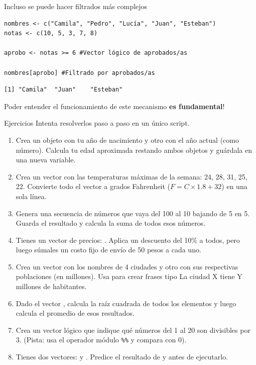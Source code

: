 \documentclass[8pt]{beamer}
\begin{document}
\begin{frame}[fragile]
	Incluso se  puede hacer filtrados m\'as complejos
	
\begin{lstlisting}[style=RScript]
nombres <- c("Camila", "Pedro", "Lucía", "Juan", "Esteban")
notas <- c(10, 5, 3, 7, 8)

aprobo <- notas >= 6 #Vector lógico de aprobados/as

nombres[aprobo] #Filtrado por aprobados/as
\end{lstlisting}
\begin{lstlisting}[style=RConsole]
[1] "Camila"  "Juan"    "Esteban"
\end{lstlisting}

Poder entender el funcionamiento de este mecanismo \textbf{es fundamental}!
\end{frame}


\begin{frame}[fragile]{Ejercicios}
	Intenta resolverlos paso a paso en un \'unico script.
	
	\begin{enumerate}
		\item Crea un objeto con tu año de nacimiento y otro con el año actual (como número). Calcula tu edad aproximada restando ambos objetos y guárdala en una nueva variable.
		\item Crea un vector con las temperaturas máximas de la semana: 24, 28, 31, 25, 22. Convierte todo el vector a grados Fahrenheit ($F = C \times 1.8 + 32$) en una sola línea.
		\item Genera una secuencia de números que vaya del 100 al 10 bajando de 5 en 5. Guarda el resultado y calcula la suma de todos esos números.
		\item Tienes un vector de precios: . Aplica un descuento del 10\% a todos, pero luego súmales un costo fijo de envío de 50 pesos a cada uno.
		\item Crea un vector con los nombres de 4 ciudades y otro con sus respectivas poblaciones (en millones). Usa  para crear frases tipo \guillemetleft La ciudad X tiene Y millones de habitantes\guillemetright .
		\item Dado el vector , calcula la raíz cuadrada de todos los elementos y luego calcula el promedio de esos resultados.
		\item Crea un vector lógico que indique qué números del 1 al 20 son divisibles por 3. (Pista: usa el operador módulo \lstinline[style=RScript, basicstyle=\normalsize]`%%` y compara con 0).
		\item Tienes dos vectores:  y . Predice el resultado de  y  antes de ejecutarlo.
	\end{enumerate}
\end{frame}
\end{document}
